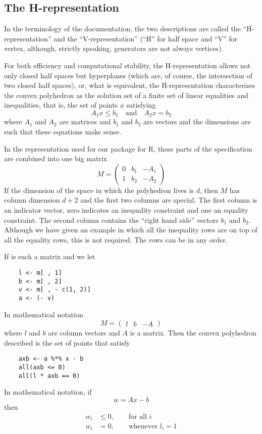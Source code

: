 \documentclass{article}
\begin{document}
\subsection{The H-representation}

In the terminology of the \verb@cddlib@ documentation,
the two descriptions are called
the ``H-representation'' and the ``V-representation''
(``H'' for half space and ``V'' for vertex,
although, strictly speaking, generators are not always vertices).

For both efficiency and computational stability, the H-representation
allows not only closed half spaces but hyperplanes (which are, of course, the
intersection of two closed half spaces), or, what is equivalent,
the H-representation characterizes the convex polyhedron as the solution
set of a finite set of linear equalities and inequalities, that is,
the set of points $x$ satisfying
$$
   A_1 x \le b_1 \quad \text{and} \quad A_2 x = b_2
$$
where $A_1$ and $A_2$ are matrices and $b_1$ and $b_2$ are vectors
and the dimensions are such that these equations make sense.

In the representation used for our \verb@rcdd@ package
for R, these parts of the specification are combined into one big matrix
$$
   M = \begin{pmatrix} 0 & b_1 & - A_1 \\ 1 & b_2 & - A_2 \end{pmatrix}
$$
If the dimension of the space in which the polyhedron lives is $d$,
then $M$ has column dimension $d + 2$ and the first two columns are special.
The first column is an indicator vector, zero indicates an inequality
constraint and one an equality constraint.  The second column contains
the ``right hand side'' vectors $b_1$ and $b_2$.  Although we have given
an example in which all the inequality rows are on top of all the equality
rows, this is not required.  The rows can be in any order.

If \verb@m@ is such a matrix and we let
\begin{verbatim}
    l <- m[ , 1]
    b <- m[ , 2]
    v <- m[ , - c(1, 2)]
    a <- (- v)
\end{verbatim}
In mathematical notation
$$
   M = \begin{pmatrix} l & b & - A \end{pmatrix}
$$
where $l$ and $b$ are column vectors and $A$ is a matrix.
Then the convex polyhedron described is the set of points \verb@x@ that
satisfy
\begin{verbatim}
    axb <- a %*% x - b
    all(axb <= 0)
    all(l * axb == 0)
\end{verbatim}
In mathematical notation, if
$$
   w = A x - b
$$
then
\begin{align*}
   w_i & \le 0, \qquad \text{for all $i$}
   \\
   w_i & = 0, \qquad \text{whenever $l_i = 1$}
\end{align*}
\end{document}
